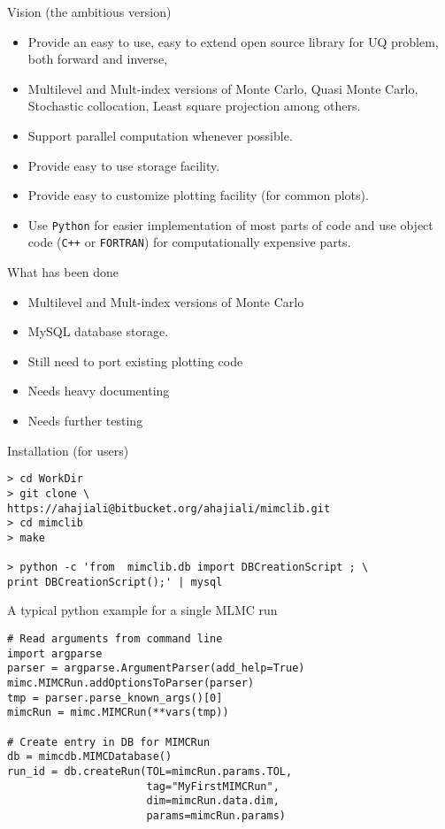 {
\nofooter \noheader \frame[noframenumbering]{\titlepage}
}

\begin{frame}{Vision (the ambitious version)}
  \begin{itemize}
  \item Provide an easy to use, easy to extend open source
    library for UQ problem, both forward and inverse,
  \item Multilevel and Mult-index versions of Monte Carlo, Quasi Monte
    Carlo, Stochastic collocation, Least square projection among
    others.
  \item Support parallel computation whenever possible.
  \item Provide easy to use storage facility.
  \item Provide easy to customize plotting facility (for common plots).
  \item Use \texttt{Python} for easier implementation of most parts of code
    and use object code (\texttt{C++} or \texttt{FORTRAN}) for
    computationally expensive parts.
  \end{itemize}
\end{frame}

\begin{frame}{What has been done}
  \begin{itemize}
  \item Multilevel and Mult-index versions of Monte Carlo
  \item MySQL database storage.
  \item Still need to port existing plotting code
  \item Needs heavy documenting
  \item Needs further testing
  \end{itemize}
\end{frame}

\begin{frame}[fragile]{Installation (for users)}
\begin{verbatim}
> cd WorkDir
> git clone \
https://ahajiali@bitbucket.org/ahajiali/mimclib.git
> cd mimclib
> make

> python -c 'from  mimclib.db import DBCreationScript ; \
print DBCreationScript();' | mysql
\end{verbatim}
\end{frame}

\begin{frame}[fragile]{A typical python example for a single MLMC run}
\begin{verbatim}
# Read arguments from command line
import argparse
parser = argparse.ArgumentParser(add_help=True)
mimc.MIMCRun.addOptionsToParser(parser)
tmp = parser.parse_known_args()[0]
mimcRun = mimc.MIMCRun(**vars(tmp))

# Create entry in DB for MIMCRun
db = mimcdb.MIMCDatabase()
run_id = db.createRun(TOL=mimcRun.params.TOL,
                      tag="MyFirstMIMCRun",
                      dim=mimcRun.data.dim,
                      params=mimcRun.params)
\end{verbatim}
\end{frame}

